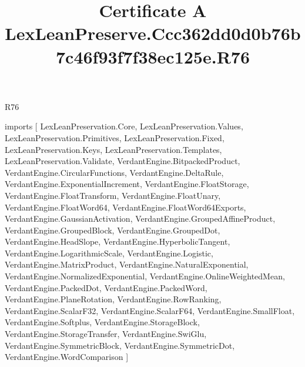 \begin{lexlean}{R76}
\title{Certificate A LexLeanPreserve.Ccc362dd0d0b76b7c46f93f7f38ec125e.R76}
\begin{coremodule}
imports [
  LexLeanPreservation.Core,
  LexLeanPreservation.Values,
  LexLeanPreservation.Primitives,
  LexLeanPreservation.Fixed,
  LexLeanPreservation.Keys,
  LexLeanPreservation.Templates,
  LexLeanPreservation.Validate,
  VerdantEngine.BitpackedProduct,
  VerdantEngine.CircularFunctions,
  VerdantEngine.DeltaRule,
  VerdantEngine.ExponentialIncrement,
  VerdantEngine.FloatStorage,
  VerdantEngine.FloatTransform,
  VerdantEngine.FloatUnary,
  VerdantEngine.FloatWord64,
  VerdantEngine.FloatWord64Exports,
  VerdantEngine.GaussianActivation,
  VerdantEngine.GroupedAffineProduct,
  VerdantEngine.GroupedBlock,
  VerdantEngine.GroupedDot,
  VerdantEngine.HeadSlope,
  VerdantEngine.HyperbolicTangent,
  VerdantEngine.LogarithmicScale,
  VerdantEngine.Logistic,
  VerdantEngine.MatrixProduct,
  VerdantEngine.NaturalExponential,
  VerdantEngine.NormalizedExponential,
  VerdantEngine.OnlineWeightedMean,
  VerdantEngine.PackedDot,
  VerdantEngine.PackedWord,
  VerdantEngine.PlaneRotation,
  VerdantEngine.RowRanking,
  VerdantEngine.ScalarF32,
  VerdantEngine.ScalarF64,
  VerdantEngine.SmallFloat,
  VerdantEngine.Softplus,
  VerdantEngine.StorageBlock,
  VerdantEngine.StorageTransfer,
  VerdantEngine.SwiGlu,
  VerdantEngine.SymmetricBlock,
  VerdantEngine.SymmetricDot,
  VerdantEngine.WordComparison
]


\end{coremodule}
\end{lexlean}
